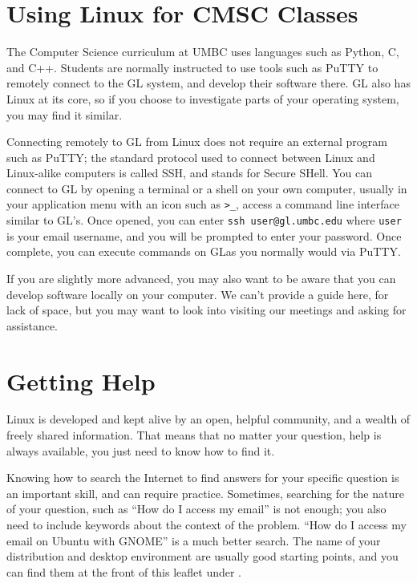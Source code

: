 \documentclass[11pt,notumble]{leaflet}
\begin{document}

\section{Using Linux for CMSC Classes}
\label{section:linux-for-cmsc}

The Computer Science curriculum at UMBC uses languages such as Python, C, and
C++. Students are normally instructed to use tools such as PuTTY to remotely
connect to the GL system, and develop their software there. GL also has Linux at
its core, so if you choose to investigate parts of your operating system, you
may find it similar.

Connecting remotely to GL from Linux does not require an external program such
as PuTTY\@; the standard protocol used to connect between Linux and Linux-alike
computers is called SSH, and stands for Secure SHell. You can connect to GL by
opening a terminal or a shell on your own computer, usually in your application
menu with an icon such as \verb+>_+, access a command line interface similar to
GL's. Once opened, you can enter \verb+ssh user@gl.umbc.edu+ where \verb+user+
is your email username, and you will be prompted to enter your password. Once
complete, you can execute commands on GL\@ as you normally would via PuTTY\@.

If you are slightly more advanced, you may also want to be aware that you can
develop software locally on your computer. We can't provide a guide here, for
lack of space, but you may want to look into visiting our meetings and asking
for assistance.


\section{Getting Help}
\label{section:getting-help}

Linux is developed and kept alive by an open, helpful community, and a wealth of
freely shared information. That means that no matter your question, help is
always available, you just need to know how to find it.

Knowing how to search the Internet to find answers for your specific question is
an important skill, and can require practice. Sometimes, searching for the
nature of your question, such as ``How do I access my email'' is not enough; you
also need to include keywords about the context of the problem. ``How do I
access my email on Ubuntu with GNOME'' is a much better search. The name of your
distribution and desktop environment are usually good starting points, and you
can find them at the front of this leaflet under .
\end{document}
